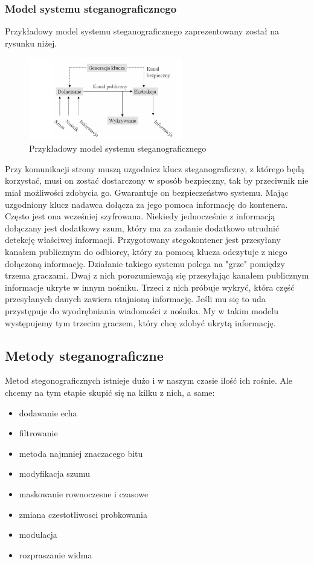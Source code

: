 \documentclass[a4paper,titleauthor]{mwart}
\begin{document}
\subsubsection{Model systemu steganograficznego}

Przykładowy model systemu steganograficznego zaprezentowany został na rysunku niżej.

  \begin{figure}[h]
	\centering
	\includegraphics[width=0.6\textwidth]{model}
	\caption{Przykładowy model systemu steganograficznego}
\end{figure}

Przy komunikacji strony muszą uzgodnicz klucz steganograficzny, z którego będą korzystać, musi on zostać dostarczony w sposób bezpieczny, tak by przeciwnik nie miał możliwości zdobycia go. Gwarantuje on bezpieczeństwo systemu. Mając uzgodniony klucz nadawca dołącza za jego pomoca informację do kontenera. Często jest ona wcześniej szyfrowana. Niekiedy jednocześnie z informacją dołączany jest dodatkowy szum, który ma za zadanie dodatkowo utrudnić detekcję właściwej informacji. Przygotowany stegokontener jest przesyłany kanałem publicznym do odbiorcy, który za pomocą klucza odczytuje z niego dołączoną informację. Działanie takiego systemu polega na "grze" pomiędzy trzema graczami. Dwaj z nich porozumiewają się przesyłając kanałem publicznym informacje ukryte w innym nośniku. Trzeci z nich próbuje wykryć, która część przesyłanych danych zawiera utajnioną informację. Jeśli mu się to uda przystępuje do wyodrębniania wiadomości z nośnika. My w takim modelu występujemy tym trzecim graczem, który chcę zdobyć ukrytą informację.

\subsection{Metody steganograficzne}

Metod stegonograficznych istnieje dużo i w naszym czasie ilość ich rośnie. Ale chcemy na tym etapie skupić się na kilku z nich, a same: \newline
\begin{itemize}
\item dodawanie echa
\item filtrowanie
\item metoda najmniej znaczacego bitu
\item modyfikacja szumu
\item maskowanie rownoczesne i czasowe
\item zmiana czestotliwosci probkowania 
\item modulacja
\item rozpraszanie widma
\end{itemize}
\end{document}
